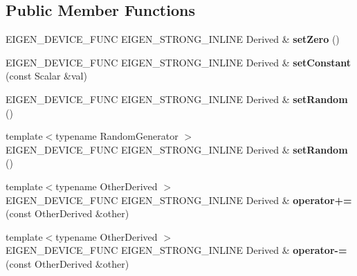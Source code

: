 \subsection*{Public Member Functions}
\begin{DoxyCompactItemize}
\item 
\mbox{\label{class_eigen_1_1_tensor_base_a99741c656da28bd2ea355d08cd52edfa}} 
E\+I\+G\+E\+N\+\_\+\+D\+E\+V\+I\+C\+E\+\_\+\+F\+U\+NC E\+I\+G\+E\+N\+\_\+\+S\+T\+R\+O\+N\+G\+\_\+\+I\+N\+L\+I\+NE Derived \& {\bfseries set\+Zero} ()
\item 
\mbox{\label{class_eigen_1_1_tensor_base_a8c19f5a6f239acf25c0932f34c343457}} 
E\+I\+G\+E\+N\+\_\+\+D\+E\+V\+I\+C\+E\+\_\+\+F\+U\+NC E\+I\+G\+E\+N\+\_\+\+S\+T\+R\+O\+N\+G\+\_\+\+I\+N\+L\+I\+NE Derived \& {\bfseries set\+Constant} (const Scalar \&val)
\item 
\mbox{\label{class_eigen_1_1_tensor_base_a2ac4183b51dfe9eb60be6c9a8230486c}} 
E\+I\+G\+E\+N\+\_\+\+D\+E\+V\+I\+C\+E\+\_\+\+F\+U\+NC E\+I\+G\+E\+N\+\_\+\+S\+T\+R\+O\+N\+G\+\_\+\+I\+N\+L\+I\+NE Derived \& {\bfseries set\+Random} ()
\item 
\mbox{\label{class_eigen_1_1_tensor_base_a92314eb2b5a6930ea8647bee0bcb2ee3}} 
{\footnotesize template$<$typename Random\+Generator $>$ }\\E\+I\+G\+E\+N\+\_\+\+D\+E\+V\+I\+C\+E\+\_\+\+F\+U\+NC E\+I\+G\+E\+N\+\_\+\+S\+T\+R\+O\+N\+G\+\_\+\+I\+N\+L\+I\+NE Derived \& {\bfseries set\+Random} ()
\item 
\mbox{\label{class_eigen_1_1_tensor_base_ae4d3345a004772e2dbae575f98cdfe68}} 
{\footnotesize template$<$typename Other\+Derived $>$ }\\E\+I\+G\+E\+N\+\_\+\+D\+E\+V\+I\+C\+E\+\_\+\+F\+U\+NC E\+I\+G\+E\+N\+\_\+\+S\+T\+R\+O\+N\+G\+\_\+\+I\+N\+L\+I\+NE Derived \& {\bfseries operator+=} (const Other\+Derived \&other)
\item 
\mbox{\label{class_eigen_1_1_tensor_base_aa20d4f30a69bc63b26941e625a9ca922}} 
{\footnotesize template$<$typename Other\+Derived $>$ }\\E\+I\+G\+E\+N\+\_\+\+D\+E\+V\+I\+C\+E\+\_\+\+F\+U\+NC E\+I\+G\+E\+N\+\_\+\+S\+T\+R\+O\+N\+G\+\_\+\+I\+N\+L\+I\+NE Derived \& {\bfseries operator-\/=} (const Other\+Derived \&other)

\end{DoxyCompactItemize}
